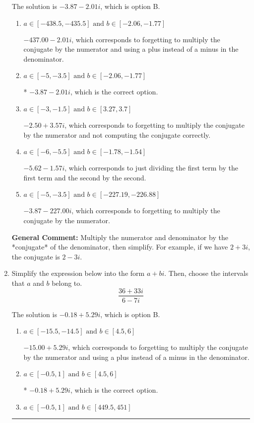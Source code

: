 \documentclass{extbook}[14pt]
\newcommand{\litem}[1]{\item #1

\rule{\textwidth}{0.4pt}}
\begin{document}
\begin{enumerate}
{The solution is \( -3.87  - 2.01 i \), which is option B.\begin{enumerate}[label=\Alph*.]
\item \( a \in [-438.5, -435.5] \text{ and } b \in [-2.06, -1.77] \)

 $-437.00  - 2.01 i$, which corresponds to forgetting to multiply the conjugate by the numerator and using a plus instead of a minus in the denominator.
\item \( a \in [-5, -3.5] \text{ and } b \in [-2.06, -1.77] \)

* $-3.87  - 2.01 i$, which is the correct option.
\item \( a \in [-3, -1.5] \text{ and } b \in [3.27, 3.7] \)

 $-2.50  + 3.57 i$, which corresponds to forgetting to multiply the conjugate by the numerator and not computing the conjugate correctly.
\item \( a \in [-6, -5.5] \text{ and } b \in [-1.78, -1.54] \)

 $-5.62  - 1.57 i$, which corresponds to just dividing the first term by the first term and the second by the second.
\item \( a \in [-5, -3.5] \text{ and } b \in [-227.19, -226.88] \)

 $-3.87  - 227.00 i$, which corresponds to forgetting to multiply the conjugate by the numerator.
\end{enumerate}

\textbf{General Comment:} Multiply the numerator and denominator by the *conjugate* of the denominator, then simplify. For example, if we have $2+3i$, the conjugate is $2-3i$.
}
\litem{
Simplify the expression below into the form $a+bi$. Then, choose the intervals that $a$ and $b$ belong to.
\[ \frac{36 + 33 i}{6 - 7 i} \]

The solution is \( -0.18  + 5.29 i \), which is option B.\begin{enumerate}[label=\Alph*.]
\item \( a \in [-15.5, -14.5] \text{ and } b \in [4.5, 6] \)

 $-15.00  + 5.29 i$, which corresponds to forgetting to multiply the conjugate by the numerator and using a plus instead of a minus in the denominator.
\item \( a \in [-0.5, 1] \text{ and } b \in [4.5, 6] \)

* $-0.18  + 5.29 i$, which is the correct option.
\item \( a \in [-0.5, 1] \text{ and } b \in [449.5, 451] \)


\end{enumerate}}
\end{enumerate}
\end{document}

